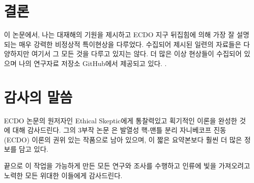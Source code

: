 \documentclass[10pt,twocolumn,letterpaper]{article}
\begin{document}
\section{결론}

이 논문에서, 나는 대재해의 기원을 제시하고 ECDO 지구 뒤집힘에 의해 가장 잘 설명되는 매우 강력한 비정상적 특이현상을 다루었다. 수집되어 제시된 일련의 자료들은 다양하지만 여기서 그 모든 것을 다루고 있지는 않다.  더 많은 이상 현상들이 수집되어 있으며 나의 연구자료 저장소 GitHub에서 제공되고 있다.  \cite{2}.

\section{감사의 말씀}

 ECDO 논문의 원저자인 Ethical Skeptic에게 통찰력있고 획기적인 이론을 완성한 것에 대해 감사드린다. 그의 3부작 논문 \cite{1}은 발열성 핵-맨틀 분리 자니베코프 진동 (ECDO) 이론의 권위 있는 작품으로 남아 있으며, 이 짧은 요약본보다 훨씬 더 많은 정보를 담고 있다.

끝으로 이 작업을 가능하게 만든 모든 연구와 조사를 수행하고 인류에 빛을 가져오려고 노력한 모든 위대한 이들에게 감사드린다.

{\small


}
\end{document}

